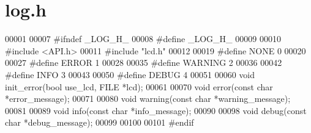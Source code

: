\section{log.\+h}
\label{log_8h_source}

\begin{DoxyCode}
00001 
00007 \textcolor{preprocessor}{#ifndef \_LOG\_H\_}
00008 \textcolor{preprocessor}{#define \_LOG\_H\_}
00009 
00010 \textcolor{preprocessor}{#include <API.h>}
00011 \textcolor{preprocessor}{#include "lcd.h"}
00012 
00019 \textcolor{preprocessor}{#define NONE 0}
00020 
00027 \textcolor{preprocessor}{#define ERROR 1}
00028 
00035 \textcolor{preprocessor}{#define WARNING 2}
00036 
00042 \textcolor{preprocessor}{#define INFO 3}
00043 
00050 \textcolor{preprocessor}{#define DEBUG 4}
00051 
00060 \textcolor{keywordtype}{void} init_error(\textcolor{keywordtype}{bool} use\_lcd, FILE *lcd);
00061 
00070 \textcolor{keywordtype}{void} error(\textcolor{keyword}{const} \textcolor{keywordtype}{char} *error\_message);
00071 
00080 \textcolor{keywordtype}{void} warning(\textcolor{keyword}{const} \textcolor{keywordtype}{char} *warning\_message);
00081 
00089 \textcolor{keywordtype}{void} info(\textcolor{keyword}{const} \textcolor{keywordtype}{char} *info\_message);
00090 
00098 \textcolor{keywordtype}{void} debug(\textcolor{keyword}{const} \textcolor{keywordtype}{char} *debug\_message);
00099 
00100 
00101 \textcolor{preprocessor}{#endif}
\end{DoxyCode}
